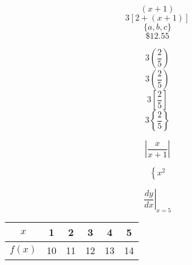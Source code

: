\documentclass[12pt]{article}
\begin{document}
$$(x+1)$$
$$3[2+(x+1)]$$
$$\{a,b,c\}$$
$$\$12.55$$

$$3(\frac{2}{5})$$
$$3\left(\frac{2}{5}\right)$$
$$3\left[\frac{2}{5}\right]$$
$$3\left\{\frac{2}{5}\right\}$$

$$\left|\frac{x}{x+1}\right|$$

$$\left\{x^2\right.$$

$${\left.\frac{dy}{dx}\right|}_{x=5}$$

\begin{tabular}{|c|c|c|c|c|c|}
\hline
$x$ & 1 & 2 & 3 & 4 & 5\\ \hline
$f(x)$ & 10 & 11 & 12 & 13 & 14\\ \hline
\end{tabular}
\end{document}
